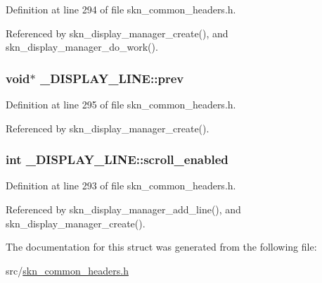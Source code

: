 Definition at line 294 of file skn\+\_\+common\+\_\+headers.\+h.



Referenced by skn\+\_\+display\+\_\+manager\+\_\+create(), and skn\+\_\+display\+\_\+manager\+\_\+do\+\_\+work().

\subsubsection[{\texorpdfstring{prev}{prev}}]{\setlength{\rightskip}{0pt plus 5cm}void$\ast$ \+\_\+\+D\+I\+S\+P\+L\+A\+Y\+\_\+\+L\+I\+N\+E\+::prev}\hypertarget{struct___d_i_s_p_l_a_y___l_i_n_e_aadc57636aadef3cff11443217e7f50e5}{}\label{struct___d_i_s_p_l_a_y___l_i_n_e_aadc57636aadef3cff11443217e7f50e5}


Definition at line 295 of file skn\+\_\+common\+\_\+headers.\+h.



Referenced by skn\+\_\+display\+\_\+manager\+\_\+create().

\subsubsection[{\texorpdfstring{scroll\+\_\+enabled}{scroll_enabled}}]{\setlength{\rightskip}{0pt plus 5cm}int \+\_\+\+D\+I\+S\+P\+L\+A\+Y\+\_\+\+L\+I\+N\+E\+::scroll\+\_\+enabled}\hypertarget{struct___d_i_s_p_l_a_y___l_i_n_e_ad92346a9708f3f3ba0c45dfb891c18e3}{}\label{struct___d_i_s_p_l_a_y___l_i_n_e_ad92346a9708f3f3ba0c45dfb891c18e3}


Definition at line 293 of file skn\+\_\+common\+\_\+headers.\+h.



Referenced by skn\+\_\+display\+\_\+manager\+\_\+add\+\_\+line(), and skn\+\_\+display\+\_\+manager\+\_\+create().



The documentation for this struct was generated from the following file\+:\begin{DoxyCompactItemize}
\item 
src/\hyperlink{skn__common__headers_8h}{skn\+\_\+common\+\_\+headers.\+h}\end{DoxyCompactItemize}
